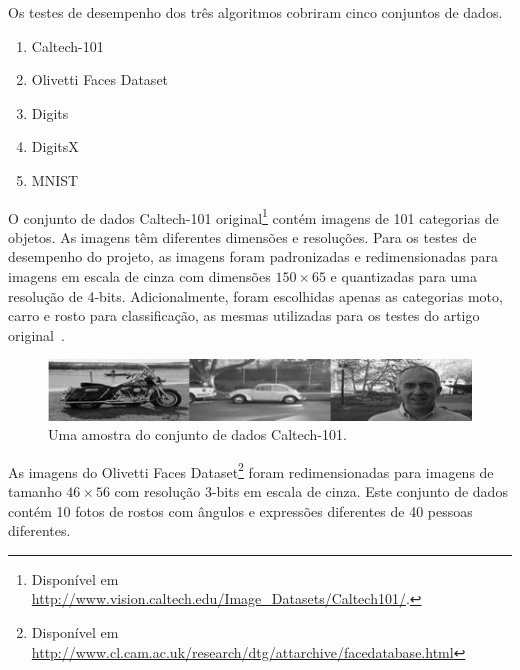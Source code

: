 \documentclass[12pt]{article}
\theoremstyle{plain}
\numberwithin{equation}{section}
\begin{document}
Os testes de desempenho dos três algoritmos cobriram cinco conjuntos de dados.

\begin{enumerate}[label=\,(\alph*)]
  \item Caltech-101~\cite{caltech101}
  \item Olivetti Faces Dataset~\cite{olivetti}
  \item Digits~\cite{digits}
  \item DigitsX~\cite{digitsx}
  \item MNIST~\cite{mnist}
\end{enumerate}

O conjunto de dados Caltech-101 original\footnote{Disponível em
  \url{http://www.vision.caltech.edu/Image_Datasets/Caltech101/}.} contém imagens de 101 categorias
de objetos. As imagens têm diferentes dimensões e resoluções. Para os testes de desempenho do
projeto, as imagens foram padronizadas e redimensionadas para imagens em escala de cinza com
dimensões $150\times 65$ e quantizadas para uma resolução de 4-bits.  Adicionalmente, foram
escolhidas apenas as categorias moto, carro e rosto para classificação, as mesmas utilizadas para
os testes do artigo original~\cite{poon-domingos}.

\begin{figure}[h]
  \centering\includegraphics[scale=1.0]{imgs/caltech_sample.png}
  \caption{Uma amostra do conjunto de dados Caltech-101.}
\end{figure}

As imagens do Olivetti Faces Dataset\footnote{Disponível em
  \url{http://www.cl.cam.ac.uk/research/dtg/attarchive/facedatabase.html}} foram redimensionadas
para imagens de tamanho $46\times 56$ com resolução 3-bits em escala de cinza. Este conjunto de
dados contém 10 fotos de rostos com ângulos e expressões diferentes de 40 pessoas diferentes.
\end{document}
